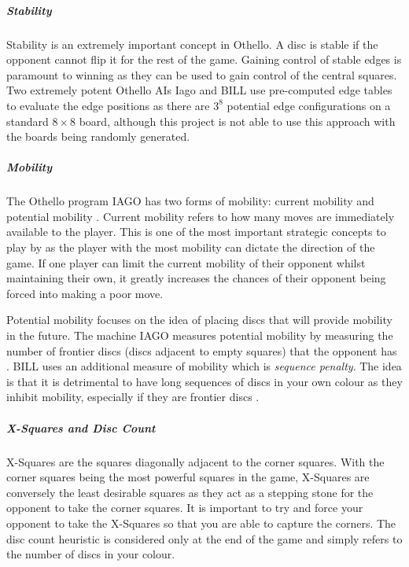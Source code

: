 \documentclass[12pt,a4paper]{article}
\begin{document}
\subparagraph{Stability}

Stability is an extremely important concept in Othello. A disc is stable if the opponent cannot flip it for the rest of the game. Gaining control of stable edges is paramount to winning as they can be used to gain control of the central squares. Two extremely potent Othello AIs Iago \cite{rosenbloom1982world} and BILL \cite{lee1990development} use pre-computed edge tables to evaluate the edge positions as there are $3^8$ potential edge configurations on a standard $8\times8$ board, although this project is not able to use this approach with the boards being randomly generated. 

\subparagraph{Mobility}

The Othello program IAGO has two forms of mobility: current mobility and potential mobility \cite{rosenbloom1982world}. Current mobility refers to how many moves are immediately available to the player. This is one of the most important strategic concepts to play by as the player with the most mobility can dictate the direction of the game. If one player can limit the current  mobility of their opponent whilst maintaining their own, it greatly increases the chances of their opponent being forced into making a poor move.

Potential mobility focuses on the idea of placing discs that will provide mobility in the future. The machine IAGO measures potential mobility by measuring the number of frontier discs (discs adjacent to empty squares) that the opponent has  \cite{rosenbloom1982world}. BILL uses an additional measure of mobility which is \textit{sequence penalty}. The idea is that it is detrimental to have long sequences of discs in your own colour as they inhibit mobility, especially if they are frontier discs \cite{lee1990development}.

\subparagraph{X-Squares and Disc Count}

X-Squares are the squares diagonally adjacent to the corner squares. With the corner squares being the most powerful squares in the game, X-Squares are conversely the least desirable squares as they act as a stepping stone for the opponent to take the corner squares. It is important to try and force your opponent to take the X-Squares so that you are able to capture the corners. The disc count heuristic is considered only at the end of the game and simply refers to the number of discs in your colour.

\bigskip
\end{document}
